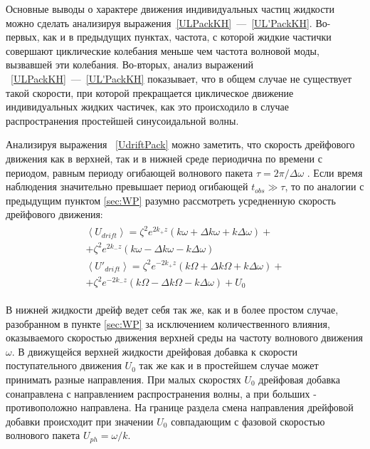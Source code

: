 Основные выводы о характере движения индивидуальных частиц жидкости можно сделать анализируя выражения~\eqref{ULPackKH}~---~\eqref{UL'PackKH}. Во-первых, как и в предыдущих пунктах, частота, с которой жидкие частички совершают циклические колебания меньше чем частота волновой моды, вызвавшей эти колебания. Во-вторых, анализ выражений ~\eqref{ULPackKH}~---~\eqref{UL'PackKH} показывает, что в общем случае не существует такой скорости, при которой прекращается циклическое движение индивидуальных жидких частичек, как это происходило в случае распространения простейшей синусоидальной волны. 

Анализируя выражения ~\eqref{UdriftPack} можно заметить, что скорость дрейфового движения как в верхней, так и в нижней среде периодична по времени с периодом, равным периоду огибающей волнового пакета $ \tau=2\pi/\Delta \omega $ . Если время наблюдения значительно превышает период огибающей  $ t_{obs}\gg \tau $, то по аналогии с предыдущим пунктом \ref{sec:WP} разумно рассмотреть усредненную скорость дрейфового движения:
\begin{gather}
\begin{gathered}
\left\langle U_{drift}\right\rangle =\zeta^{2}e^{2k_{+}z}\left( k \omega +\Delta k \omega +k \Delta \omega \right) +\\
+\zeta^{2}e^{2k_{-}z}\left( k \omega -\Delta k \omega -k \Delta \omega \right)\\
\left\langle U'_{drift}\right\rangle =\zeta^{2}e^{-2k_{+}z}\left( k \Omega +\Delta k \Omega +k \Delta \omega \right) +\\
+\zeta^{2}e^{-2k_{-}z}\left( k \Omega -\Delta k \Omega -k \Delta \omega \right)+U_{0}
\label{USRdriftPack}
\end{gathered}
\end{gather}
	  	
В нижней жидкости дрейф ведет себя так же, как и в более простом случае, разобранном в пункте \ref{sec:WP} за исключением количественного влияния, оказываемого скоростью движения верхней среды на частоту волнового движения $ \omega $. В движущейся верхней жидкости  дрейфовая добавка к скорости поступательного движения $ U_{0} $ так же как и в простейшем случае может принимать разные направления. При малых скоростях $ U_{0} $ дрейфовая добавка сонаправлена с направлением распространения волны, а при больших - противоположно направлена. На границе раздела смена направления дрейфовой добавки происходит при значении $ U_{0} $ совпадающим с фазовой скоростью волнового пакета $ U_{ph}=\omega/k $. 

